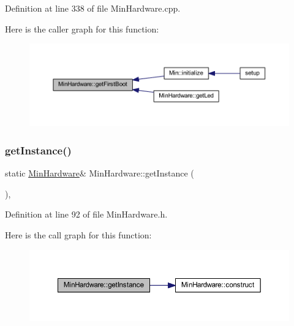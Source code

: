 Definition at line 338 of file Min\+Hardware.\+cpp.

Here is the caller graph for this function\+:
\nopagebreak
\begin{figure}[H]
\begin{center}
\leavevmode
\includegraphics[width=350pt]{d0/d93/class_min_hardware_a8227e23999bf74110a124c889c80759e_icgraph}
\end{center}
\end{figure}
\mbox{\label{class_min_hardware_a47f2709e0cba6ed3b9d35fdd8baf8765}} 
\subsubsection{\texorpdfstring{get\+Instance()}{getInstance()}}
{\footnotesize\ttfamily static \hyperlink{class_min_hardware}{Min\+Hardware}\& Min\+Hardware\+::get\+Instance (\begin{DoxyParamCaption}{ }\end{DoxyParamCaption})\hspace{0.3cm}{\ttfamily [inline]}, {\ttfamily [static]}}



Definition at line 92 of file Min\+Hardware.\+h.

Here is the call graph for this function\+:
\nopagebreak
\begin{figure}[H]
\begin{center}
\leavevmode
\includegraphics[width=350pt]{d0/d93/class_min_hardware_a47f2709e0cba6ed3b9d35fdd8baf8765_cgraph}
\end{center}
\end{figure}
\mbox{\label{class_min_hardware_a1401ae874f57cc5ce31032c8eea57fbd}} 
